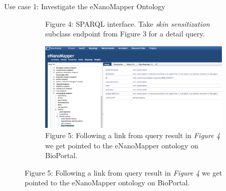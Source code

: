 \documentclass[final]{beamer}
\begin{document}
\begin{frame}{}
\begin{textblock}{62}
\begin{block}{Use case 1: Investigate the eNanoMapper Ontology}
\begin{figure}
\begin{subfigure}[c]{0.3\textwidth}
            \caption{Figure 4: SPARQL interface. Take \emph{skin sensitization} subclass endpoint from Figure 3 for a detail query.}
          \end{subfigure}
          \hspace{0.2\textwidth}
          \begin{subfigure}[c]{0.3\textwidth}
            \includegraphics[width=\textwidth,keepaspectratio]{onto-use-case-1d.png}
            \caption{Figure 5: Following a link from query result in \emph{Figure 4} we get pointed to the eNanoMapper ontology on BioPortal.}
          \end{subfigure}
        \end{figure}
      \end{block}
    \end{textblock}


\end{frame}
\end{document}
